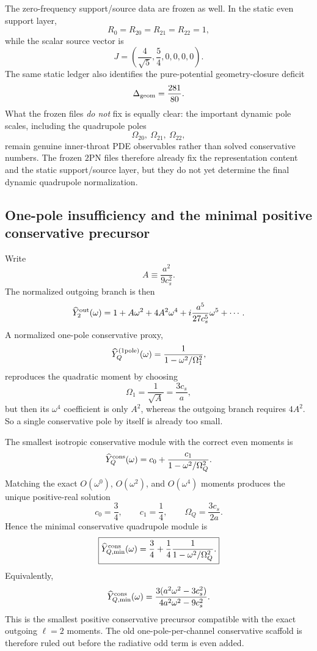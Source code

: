 \documentclass[11pt]{article}
\begin{document}
The zero-frequency support/source data are frozen as well.  In the static even
support layer,
\[
R_0=R_{20}=R_{21}=R_{22}=1,
\]
while the scalar source vector is
\[
J=\left(\frac{4}{\sqrt5},\frac54,0,0,0,0\right).
\]
The same static ledger also identifies the pure-potential geometry-closure
deficit
\[
\Delta_{\rm geom}=\frac{281}{80}.
\]
What the frozen files \emph{do not} fix is equally clear: the important dynamic
pole scales, including the quadrupole poles
\[
\Omega_{20},\ \Omega_{21},\ \Omega_{22},
\]
remain genuine inner-throat PDE observables rather than solved conservative
numbers.  The frozen $2$PN files therefore already fix the representation
content and the static support/source layer, but they do not yet determine the
final dynamic quadrupole normalization.

\subsection{One-pole insufficiency and the minimal positive conservative precursor}
\label{app:qnorm-minimal-precursor}

Write
\[
A\equiv \frac{a^2}{9c_s^2}.
\]
The normalized outgoing branch is then
\[
\widehat Y_2^{\rm out}(\omega)
=
1+A\omega^2+4A^2\omega^4+i\frac{a^5}{27c_s^5}\omega^5+\cdots.
\]
A normalized one-pole conservative proxy,
\[
\widehat Y_Q^{(1\rm pole)}(\omega)=\frac{1}{1-\omega^2/\Omega_1^2},
\]
reproduces the quadratic moment by choosing
\[
\Omega_1=\frac{1}{\sqrt A}=\frac{3c_s}{a},
\]
but then its $\omega^4$ coefficient is only $A^2$, whereas the outgoing branch
requires $4A^2$.  So a single conservative pole by itself is already too small.

The smallest isotropic conservative module with the correct even moments is
\[
\widehat Y_Q^{\rm cons}(\omega)=c_0+\frac{c_1}{1-\omega^2/\Omega_Q^2}.
\]
Matching the exact $O(\omega^0)$, $O(\omega^2)$, and $O(\omega^4)$ moments
produces the unique positive-real solution
\begin{equation}
\boxed{
c_0=\frac34,
\qquad
c_1=\frac14,
\qquad
\Omega_Q=\frac{3c_s}{2a}.
}
\label{eq:qnorm-minimal-module-params}
\end{equation}
Hence the minimal conservative quadrupole module is
\begin{equation}
\boxed{
\widehat Y_{Q,\min}^{\rm cons}(\omega)
=
\frac34+\frac14\frac{1}{1-\omega^2/\Omega_Q^2}.
}
\label{eq:qnorm-minimal-module}
\end{equation}
Equivalently,
\[
\widehat Y_{Q,\min}^{\rm cons}(\omega)
=
\frac{3(a^2\omega^2-3c_s^2)}{4a^2\omega^2-9c_s^2}.
\]
This is the smallest positive conservative precursor compatible with the exact
outgoing $\ell=2$ moments.  The old one-pole-per-channel conservative scaffold
is therefore ruled out before the radiative odd term is even added.
\end{document}
